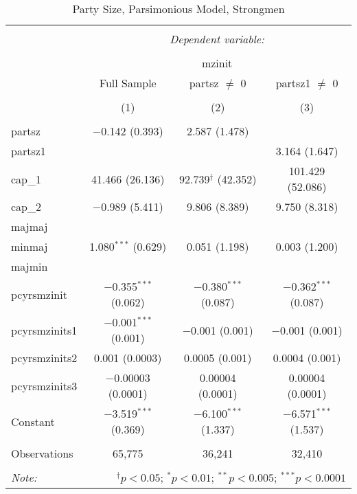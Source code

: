 
\begin{table}[!htbp] \centering 
  \caption{Party Size, Parsimonious Model, Strongmen} 
  \label{} 
\begin{tabular}{@{\extracolsep{5pt}}lccc} 
\\[-1.8ex]\hline 
\hline \\[-1.8ex] 
 & \multicolumn{3}{c}{\textit{Dependent variable:}} \\ 
\cline{2-4} 
\\[-1.8ex] & \multicolumn{3}{c}{mzinit} \\ 
 & Full Sample & partsz $\neq$ 0 & partsz1 $\neq$ 0 \\ 
\\[-1.8ex] & (1) & (2) & (3)\\ 
\hline \\[-1.8ex] 
 partsz & $-$0.142 (0.393) & 2.587 (1.478) &  \\ 
  partsz1 &  &  & 3.164 (1.647) \\ 
  cap\_1 & 41.466 (26.136) & 92.739$^{\dagger}$ (42.352) & 101.429 (52.086) \\ 
  cap\_2 & $-$0.989 (5.411) & 9.806 (8.389) & 9.750 (8.318) \\ 
  majmaj &  &  &  \\ 
  minmaj & 1.080$^{***}$ (0.629) & 0.051 (1.198) & 0.003 (1.200) \\ 
  majmin &  &  &  \\ 
  pcyrsmzinit & $-$0.355$^{***}$ (0.062) & $-$0.380$^{***}$ (0.087) & $-$0.362$^{***}$ (0.087) \\ 
  pcyrsmzinits1 & $-$0.001$^{***}$ (0.001) & $-$0.001 (0.001) & $-$0.001 (0.001) \\ 
  pcyrsmzinits2 & 0.001 (0.0003) & 0.0005 (0.001) & 0.0004 (0.001) \\ 
  pcyrsmzinits3 & $-$0.00003 (0.0001) & 0.00004 (0.0001) & 0.00004 (0.0001) \\ 
  Constant & $-$3.519$^{***}$ (0.369) & $-$6.100$^{***}$ (1.337) & $-$6.571$^{***}$ (1.537) \\ 
 \hline \\[-1.8ex] 
Observations & 65,775 & 36,241 & 32,410 \\ 
\hline 
\hline \\[-1.8ex] 
\textit{Note:}  & \multicolumn{3}{r}{$^{\dagger} p<0.05$; $^{*} p<0.01$; $^{**} p<0.005$; $^{***} p<0.0001$} \\ 
\end{tabular} 
\end{table} 
